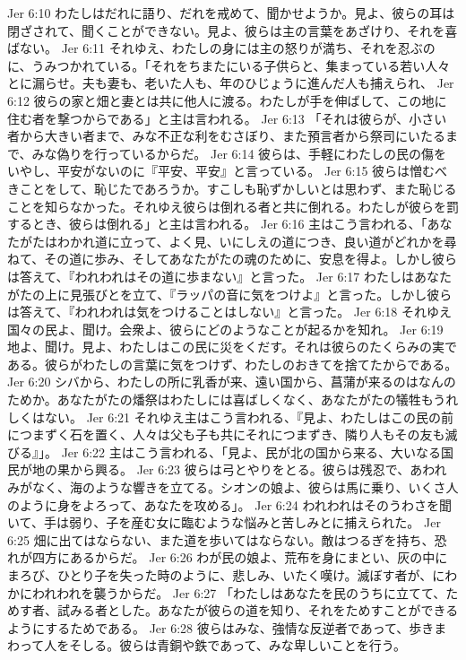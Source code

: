 Jer 6:10  わたしはだれに語り、だれを戒めて、聞かせようか。見よ、彼らの耳は閉ざされて、聞くことができない。見よ、彼らは主の言葉をあざけり、それを喜ばない。
Jer 6:11  それゆえ、わたしの身には主の怒りが満ち、それを忍ぶのに、うみつかれている。「それをちまたにいる子供らと、集まっている若い人々とに漏らせ。夫も妻も、老いた人も、年のひじょうに進んだ人も捕えられ、
Jer 6:12  彼らの家と畑と妻とは共に他人に渡る。わたしが手を伸ばして、この地に住む者を撃つからである」と主は言われる。
Jer 6:13  「それは彼らが、小さい者から大きい者まで、みな不正な利をむさぼり、また預言者から祭司にいたるまで、みな偽りを行っているからだ。
Jer 6:14  彼らは、手軽にわたしの民の傷をいやし、平安がないのに『平安、平安』と言っている。
Jer 6:15  彼らは憎むべきことをして、恥じたであろうか。すこしも恥ずかしいとは思わず、また恥じることを知らなかった。それゆえ彼らは倒れる者と共に倒れる。わたしが彼らを罰するとき、彼らは倒れる」と主は言われる。
Jer 6:16  主はこう言われる、「あなたがたはわかれ道に立って、よく見、いにしえの道につき、良い道がどれかを尋ねて、その道に歩み、そしてあなたがたの魂のために、安息を得よ。しかし彼らは答えて、『われわれはその道に歩まない』と言った。
Jer 6:17  わたしはあなたがたの上に見張びとを立て、『ラッパの音に気をつけよ』と言った。しかし彼らは答えて、『われわれは気をつけることはしない』と言った。
Jer 6:18  それゆえ国々の民よ、聞け。会衆よ、彼らにどのようなことが起るかを知れ。
Jer 6:19  地よ、聞け。見よ、わたしはこの民に災をくだす。それは彼らのたくらみの実である。彼らがわたしの言葉に気をつけず、わたしのおきてを捨てたからである。
Jer 6:20  シバから、わたしの所に乳香が来、遠い国から、菖蒲が来るのはなんのためか。あなたがたの燔祭はわたしには喜ばしくなく、あなたがたの犠牲もうれしくはない。
Jer 6:21  それゆえ主はこう言われる、『見よ、わたしはこの民の前につまずく石を置く、人々は父も子も共にそれにつまずき、隣り人もその友も滅びる』」。
Jer 6:22  主はこう言われる、「見よ、民が北の国から来る、大いなる国民が地の果から興る。
Jer 6:23  彼らは弓とやりをとる。彼らは残忍で、あわれみがなく、海のような響きを立てる。シオンの娘よ、彼らは馬に乗り、いくさ人のように身をよろって、あなたを攻める」。
Jer 6:24  われわれはそのうわさを聞いて、手は弱り、子を産む女に臨むような悩みと苦しみとに捕えられた。
Jer 6:25  畑に出てはならない、また道を歩いてはならない。敵はつるぎを持ち、恐れが四方にあるからだ。
Jer 6:26  わが民の娘よ、荒布を身にまとい、灰の中にまろび、ひとり子を失った時のように、悲しみ、いたく嘆け。滅ぼす者が、にわかにわれわれを襲うからだ。
Jer 6:27  「わたしはあなたを民のうちに立てて、ためす者、試みる者とした。あなたが彼らの道を知り、それをためすことができるようにするためである。
Jer 6:28  彼らはみな、強情な反逆者であって、歩きまわって人をそしる。彼らは青銅や鉄であって、みな卑しいことを行う。
